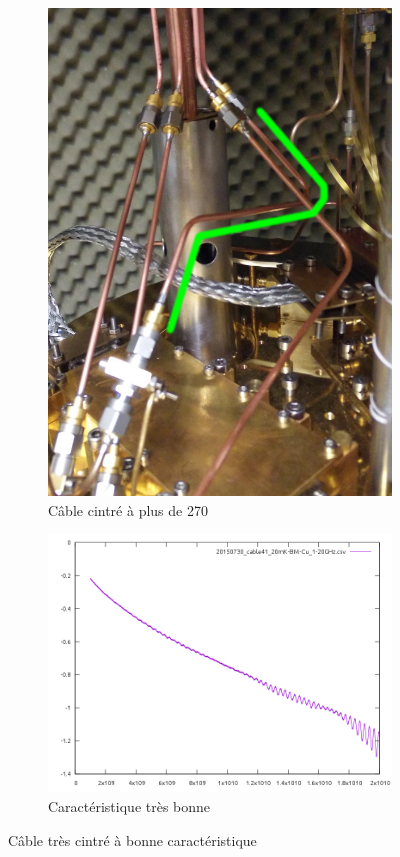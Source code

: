 \begin{figure}[ht]
    \centering
    \begin{subfigure}[t]{0.40\textwidth}
        \centering
        \includegraphics[height=1.2\textwidth]{Images/Coax/Tres_cintre}
        \caption{Câble cintré à plus de 270\textdegree }
    \end{subfigure}%
    \begin{subfigure}[t]{0.6\textwidth}
        \centering
        \includegraphics[width=1.0\textwidth]{Images/Caracs/Tres_cintre}
        \caption{Caractéristique très bonne}
    \end{subfigure}
    \caption{Câble très cintré à bonne caractéristique}
\end{figure}


